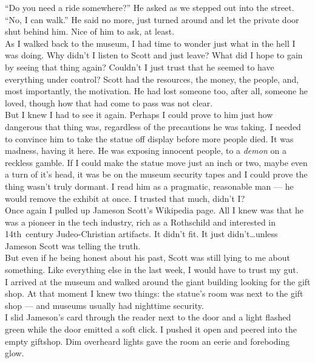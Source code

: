 \documentclass[a5paper]{scrartcl}
\begin{document}
\enquote{Do you need a ride somewhere?} He asked as we stepped out into the street.\\


\enquote{No, I can walk.} He said no more, just turned around and let the private door shut behind him.  Nice of him to ask, at least.\\


As I walked back to the museum, I had time to wonder just what in the hell I was doing. Why didn't I listen to Scott and just leave? What did I hope to gain by seeing that thing again? Couldn't I just trust that he seemed to have everything under control? Scott had the resources, the money, the people, and, most importantly, the motivation. He had lost someone too, after all, someone he loved, though how that had come to pass was not clear. \\


But I knew I had to see it again. Perhaps I could prove to him just how dangerous that thing was, regardless of the precautions he was taking. I needed to convince him to take the statue off display before more people died. It was madness, having it here. He was exposing innocent people, to a \textit{demon}
 on a reckless gamble. If I could make the statue move just an inch or two, maybe even a turn of it's head, it was be on the museum security tapes and I could prove the thing wasn't truly dormant. I read him as a pragmatic, reasonable man --- he would remove the exhibit at once. I trusted that much, didn't I? \\


Once again I pulled up Jameson Scott's Wikipedia page. All I knew was that he was  a pioneer in the tech industry, rich as a Rothschild and interested in 14th~century Judeo-Christian artifacts. It didn't fit. It just didn't\dots unless Jameson Scott was telling the truth.\\


But even if he being honest about his past, Scott was still lying to me about something. Like everything else in the last week, I would have to trust my gut.\\


I arrived at the museum and walked around the giant building looking for the gift shop. At that moment I knew two things: the statue's room was next to the gift shop --- and museums usually had nighttime security.\\


I slid Jameson's card through the reader next to the door and a light flashed green while the door emitted a soft click. I pushed it open and peered into the empty giftshop. Dim overheard lights gave the room an eerie and foreboding glow. \\
\end{document}
